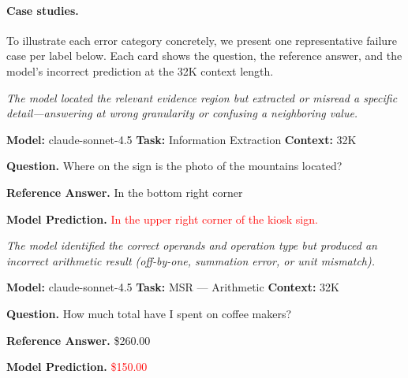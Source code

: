 \documentclass{article}
\begin{document}
\paragraph{Case studies.}
To illustrate each error category concretely, we present one representative failure case per label below. Each card shows the question, the reference answer, and the model's incorrect prediction at the 32K context length.

\vspace{0.5em}

\begin{tcolorbox}[
  title={Case Study: Grounding Failure},
  enhanced, sharp corners,
  colback=gray!3, colframe=black!40,
  boxrule=0.4pt, fonttitle=\bfseries,
  left=4pt, right=4pt, top=3pt, bottom=3pt
]
\footnotesize

\textit{The model located the relevant evidence region but extracted or misread a specific detail---answering at wrong granularity or confusing a neighboring value.}
\vspace{0.4em}

\textbf{Model:} claude-sonnet-4.5 \hfill \textbf{Task:} Information Extraction \hfill \textbf{Context:} 32K
\vspace{0.3em}

\textbf{Question.} Where on the sign is the photo of the mountains located?
\vspace{0.3em}

\textbf{Reference Answer.} In the bottom right corner

\textbf{Model Prediction.} \textcolor{red}{In the upper right corner of the kiosk sign.}

\end{tcolorbox}

\begin{tcolorbox}[
  title={Case Study: Computation Slip},
  enhanced, sharp corners,
  colback=gray!3, colframe=black!40,
  boxrule=0.4pt, fonttitle=\bfseries,
  left=4pt, right=4pt, top=3pt, bottom=3pt
]
\footnotesize

\textit{The model identified the correct operands and operation type but produced an incorrect arithmetic result (off-by-one, summation error, or unit mismatch).}
\vspace{0.4em}

\textbf{Model:} claude-sonnet-4.5 \hfill \textbf{Task:} MSR --- Arithmetic \hfill \textbf{Context:} 32K
\vspace{0.3em}

\textbf{Question.} How much total have I spent on coffee makers?
\vspace{0.3em}

\textbf{Reference Answer.} \$260.00

\textbf{Model Prediction.} \textcolor{red}{\$150.00}

\end{tcolorbox}
\end{document}
